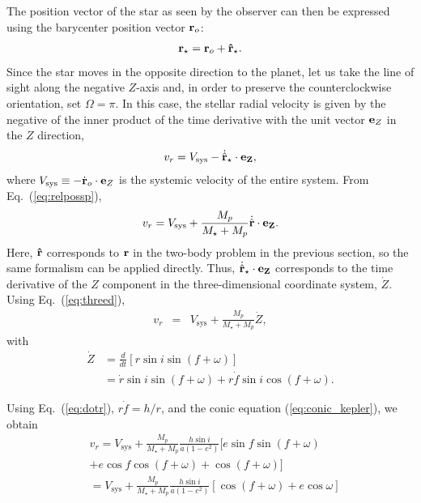 The position vector of the star as seen by the observer can then be expressed using the barycenter position vector ${\bf r}_o$:
\begin{eqnarray}
{\bf r}_\star = {\bf r}_o + {\bf \hat{r}}_\star .
\end{eqnarray}
Since the star moves in the opposite direction to the planet, let us take the line of sight along the negative $Z$-axis and, in order to preserve the counterclockwise orientation, set $\Omega = \pi$. In this case, the stellar radial velocity is given by the negative of the inner product of the time derivative with the unit vector ${\bf e}_Z$ in the $Z$ direction,
\begin{eqnarray}
\label{eq:vrsatare}
v_r = V_\mathrm{sys} - \dot{\hat{\bf r}}_\star \cdot {\bf e}_Z ,
\end{eqnarray}
where $V_\mathrm{sys} \equiv - \dot{{\bf r}}_o \cdot {\bf e}_Z $ is the systemic velocity of the entire system. From Eq.~(\ref{eq:relpossp}),
\begin{eqnarray}
\label{eq:vrsatare2}
v_r = V_\mathrm{sys} + \frac{M_p}{M_\star + M_p} \dot{\hat{\bf r}} \cdot {\bf e}_Z .
\end{eqnarray}
Here, ${\bf \hat{r}}$ corresponds to ${\bf r}$ in the two-body problem in the previous section, so the same formalism can be applied directly. Thus, $\dot{\hat{\bf r}}_\star \cdot {\bf e}_Z$ corresponds to the time derivative of the $Z$ component in the three-dimensional coordinate system, $\dot{Z}$. Using Eq.~(\ref{eq:threed}),
\begin{eqnarray}
\label{eq:vrsatare3}
v_r &=& V_\mathrm{sys} + \frac{M_p}{M_\star + M_p} \dot{Z} ,
\end{eqnarray}
with
\begin{align}
\dot{Z} &= \frac{d}{d t} \left[ r \sin{i} \sin{(f + \omega)} \right] \nonumber \\
&= \dot{r} \sin{i} \sin{(f + \omega)} + r \dot{f} \sin{i} \cos{(f + \omega)} .
\end{align}

Using Eq.~(\ref{eq:dotr}), $r \dot{f} = h/r$, and the conic equation (\ref{eq:conic_kepler}), we obtain
\begin{align}
\label{eq:vrsatare4}
&v_r =V_\mathrm{sys} + \frac{M_p}{M_\star + M_p} \frac{h \sin{i}}{a (1-e^2)} [ e \sin{f} \sin{(f+\omega)} \nonumber \\
&+ e \cos{f} \cos{(f+\omega)} + \cos{(f+\omega)} ] \\
&=V_\mathrm{sys} + \frac{M_p}{M_\star + M_p} \frac{h \sin{i}}{a (1-e^2)} \left[ \cos{(f+\omega)} + e \cos{\omega} \right] \nonumber \\
\end{align}

